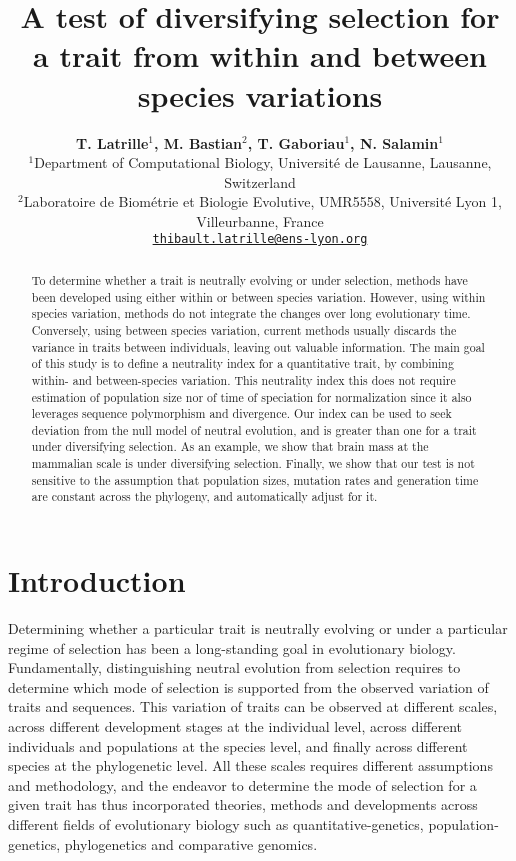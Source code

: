 \documentclass{article}
\title{A test of diversifying selection for a trait from within and between species variations}
\author{
\large
\textbf{T. {Latrille}$^{1}$\orcidlink{0000-0002-9643-4668}, M. {Bastian}$^{2}$, T. {Gaboriau}$^{1}$\orcidlink{0000-0001-7530-2204}, N. {Salamin}$^{1}$\orcidlink{0000-0002-3963-4954}}\\
\normalsize
$^{1}$Department of Computational Biology, Université de Lausanne, Lausanne, Switzerland\\
$^{2}$Laboratoire de Biométrie et Biologie Evolutive, UMR5558, Université Lyon 1, Villeurbanne, France \\
\texttt{\href{mailto:thibault.latrille@ens-lyon.org}{thibault.latrille@ens-lyon.org}} \\
}
\begin{document}
\maketitle

\begin{abstract}
    To determine whether a trait is neutrally evolving or under selection, methods have been developed using either within or between species variation.
    However, using within species variation, methods do not integrate the changes over long evolutionary time.
    Conversely, using between species variation, current methods usually discards the variance in traits between individuals, leaving out valuable information.
    The main goal of this study is to define a neutrality index for a quantitative trait, by combining within- and between-species variation.
    This neutrality index this does not require estimation of population size nor of time of speciation for normalization since it also leverages sequence polymorphism and divergence.
    Our index can be used to seek deviation from the null model of neutral evolution, and is greater than one for a trait under diversifying selection. 
    As an example, we show that brain mass at the mammalian scale is under diversifying selection. 
    Finally, we show that our test is not sensitive to the assumption that population sizes, mutation rates and generation time are constant across the phylogeny, and automatically adjust for it.
\end{abstract}


\section{Introduction}\label{sec:introduction}

Determining whether a particular trait is neutrally evolving or under a particular regime of selection has been a long-standing goal in evolutionary biology.
Fundamentally, distinguishing neutral evolution from selection requires to determine which mode of selection is supported from the observed variation of traits and sequences.
This variation of traits can be observed at different scales, across different development stages at the individual level, across different individuals and populations at the species level, and finally across different species at the phylogenetic level.
All these scales requires different assumptions and methodology, and the endeavor to determine the mode of selection for a given trait has thus incorporated theories, methods and developments across different fields of evolutionary biology such as quantitative-genetics, population-genetics, phylogenetics and comparative genomics\cite{lynch_genetics_1998, walsh_evolution_2018}.
\end{document}
